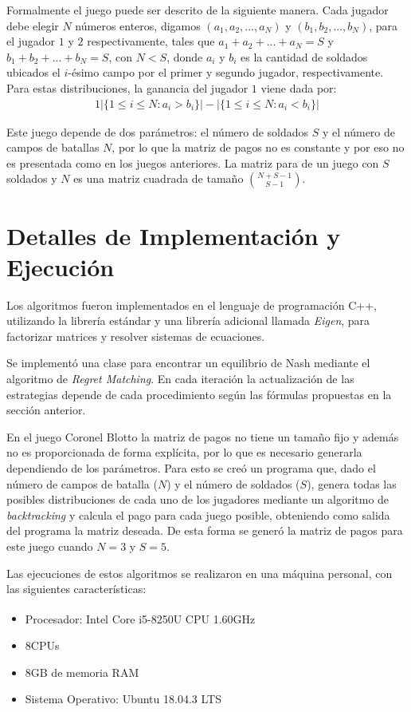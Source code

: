 Formalmente el juego puede ser descrito de la siguiente manera. Cada jugador debe elegir $N$ números enteros, digamos $(a_1, a_2, ..., a_N)$ y $(b_1, b_2, ..., b_N)$, para el jugador $1$ y $2$ respectivamente, tales que $a_1 + a_2 + ... + a_N = S$ y $b_1 + b_2 + ... + b_N = S$, con $N < S$, donde $a_i$ y $b_i$ es la cantidad de soldados ubicados el $i$-ésimo campo por el primer y segundo jugador, respectivamente. Para estas distribuciones, la ganancia del jugador $1$ viene dada por:
\begin{alignat}{1}
|\{ 1 \leq i \leq N : a_i > b_i\}| - |\{ 1 \leq i \leq N : a_i < b_i\}|
\end{alignat}

Este juego depende de dos parámetros: el número de soldados $S$ y el número de campos de batallas $N$, por lo que la matriz de pagos no es constante y por eso no es presentada como en los juegos anteriores. La matriz para de un juego con $S$ soldados y $N$ es una matriz cuadrada de tamaño $\binom{N+S-1}{S-1}$.

\section{Detalles de Implementación y Ejecución}

Los algoritmos fueron implementados en el lenguaje de programación C++, utilizando la librería estándar y una librería adicional llamada \textit{Eigen}, para factorizar matrices y resolver sistemas de ecuaciones.

Se implementó una clase para encontrar un equilibrio de Nash mediante el algoritmo de \textit{Regret Matching}. En cada iteración la actualización de las estrategias depende de cada procedimiento según las fórmulas propuestas en la sección anterior.

En el juego Coronel Blotto la matriz de pagos no tiene un tamaño fijo y además no es proporcionada de forma explícita, por lo que es necesario generarla dependiendo de los parámetros. Para esto se creó un programa que, dado el número de campos de batalla ($N$) y el número de soldados ($S$), genera todas las posibles distribuciones de cada uno de los jugadores mediante un algoritmo de \textit{backtracking} y calcula el pago para cada juego posible, obteniendo como salida del programa la matriz deseada. De esta forma se generó la matriz de pagos para este juego cuando $N = 3$ y $S = 5$.

Las ejecuciones de estos algoritmos se realizaron en una máquina personal, con las siguientes características:
\begin{itemize}[noitemsep]
    \item Procesador: Intel\textsuperscript{\textregistered} Core\textsuperscript{\texttrademark} i5-8250U CPU   1.60GHz
    \item 8CPUs
    \item 8GB de memoria RAM
    \item Sistema Operativo: Ubuntu 18.04.3 LTS
\end{itemize}


